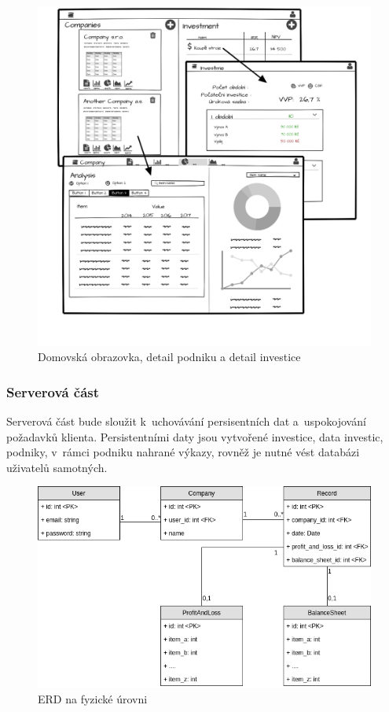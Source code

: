 \begin{figure}
  \centering
  \includegraphics[width=14cm]{img/gui_mockup.png}
  \caption{Domovská obrazovka, detail podniku a detail investice}
\end{figure}

\subsubsection{Serverová část}
Serverová část bude sloužit k~uchovávání persisentních dat a~uspokojování požadavků klienta. Persistentními daty jsou vytvořené investice, data investic, podniky, v~rámci podniku nahrané výkazy, rovněž je nutné vést databázi uživatelů samotných.


\begin{figure}
  \centering
  \includegraphics[width=14cm]{img/erd.png}
  \caption{ERD na fyzické úrovni}
\end{figure}

